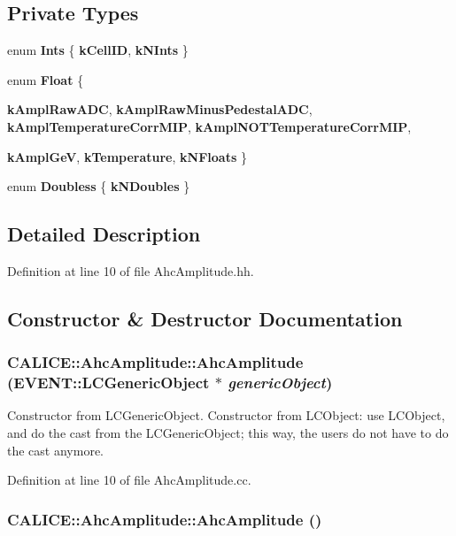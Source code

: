 \subsection*{Private Types}
\begin{DoxyCompactItemize}
\item 
enum {\bfseries Ints} \{ {\bfseries kCellID}, 
{\bfseries kNInts}
 \}
\item 
enum {\bfseries Float} \{ \par
{\bfseries kAmplRawADC}, 
{\bfseries kAmplRawMinusPedestalADC}, 
{\bfseries kAmplTemperatureCorrMIP}, 
{\bfseries kAmplNOTTemperatureCorrMIP}, 
\par
{\bfseries kAmplGeV}, 
{\bfseries kTemperature}, 
{\bfseries kNFloats}
 \}
\item 
enum {\bfseries Doubless} \{ {\bfseries kNDoubles}
 \}
\end{DoxyCompactItemize}


\subsection{Detailed Description}


Definition at line 10 of file AhcAmplitude.hh.

\subsection{Constructor \& Destructor Documentation}
\subsubsection[{AhcAmplitude}]{\setlength{\rightskip}{0pt plus 5cm}CALICE::AhcAmplitude::AhcAmplitude (EVENT::LCGenericObject $\ast$ {\em genericObject})}\label{classCALICE_1_1AhcAmplitude_ae33ff63a6cd838b59b3def113aa879cf}


Constructor from LCGenericObject. Constructor from LCObject: use LCObject, and do the cast from the LCGenericObject; this way, the users do not have to do the cast anymore. 

Definition at line 10 of file AhcAmplitude.cc.
\subsubsection[{AhcAmplitude}]{\setlength{\rightskip}{0pt plus 5cm}CALICE::AhcAmplitude::AhcAmplitude ()}\label{classCALICE_1_1AhcAmplitude_a2c64ca265f3605c0aa7418ec62f130f6}


